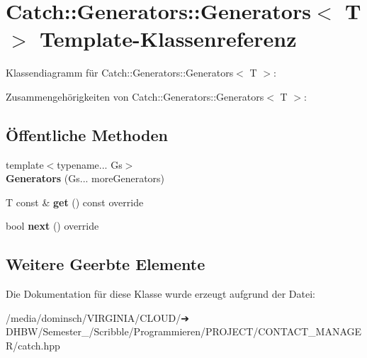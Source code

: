 \hypertarget{classCatch_1_1Generators_1_1Generators}{}\section{Catch\+:\+:Generators\+:\+:Generators$<$ T $>$ Template-\/\+Klassenreferenz}
\label{classCatch_1_1Generators_1_1Generators}


Klassendiagramm für Catch\+:\+:Generators\+:\+:Generators$<$ T $>$\+:


Zusammengehörigkeiten von Catch\+:\+:Generators\+:\+:Generators$<$ T $>$\+:
\subsection*{Öffentliche Methoden}
\begin{DoxyCompactItemize}
\item 
\mbox{\label{classCatch_1_1Generators_1_1Generators_a0288170b30cd0fdfef6efc2d9bc8acba}} 
{\footnotesize template$<$typename... Gs$>$ }\\{\bfseries Generators} (Gs... more\+Generators)
\item 
\mbox{\label{classCatch_1_1Generators_1_1Generators_a66705482b7efa88cae6e6b7062d5de6a}} 
T const  \& {\bfseries get} () const override
\item 
\mbox{\label{classCatch_1_1Generators_1_1Generators_ad127fd2a07347b527f79ab3b78bd40fb}} 
bool {\bfseries next} () override
\end{DoxyCompactItemize}
\subsection*{Weitere Geerbte Elemente}


Die Dokumentation für diese Klasse wurde erzeugt aufgrund der Datei\+:\begin{DoxyCompactItemize}
\item 
/media/dominsch/\+V\+I\+R\+G\+I\+N\+I\+A/\+C\+L\+O\+U\+D/➔ D\+H\+B\+W/\+Semester\+\_/\+Scribble/\+Programmieren/\+P\+R\+O\+J\+E\+C\+T/\+C\+O\+N\+T\+A\+C\+T\+\_\+\+M\+A\+N\+A\+G\+E\+R/catch.\+hpp\end{DoxyCompactItemize}
